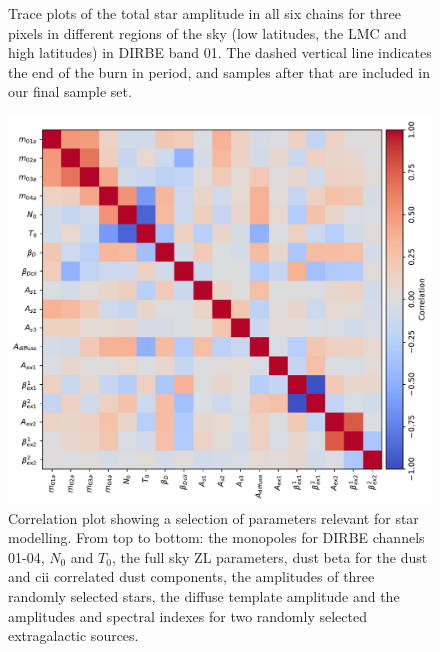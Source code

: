 \documentclass{aa}
\begin{document}
\begin{figure}
  \caption{Trace plots of the total star amplitude in all six chains for three pixels in different regions of the sky (low latitudes, the LMC and high latitudes) in DIRBE band 01. The dashed vertical line indicates the end of the burn in period, and samples after that are included in our final sample set.}
  \label{fig:amptrace}
\end{figure}

\begin{figure}
  \centering
  \includegraphics[width=\textwidth]{figs/correlation/covmatrix.pdf}
  \caption{Correlation plot showing a selection of parameters relevant for star modelling. From top to bottom: the monopoles for DIRBE channels 01-04, $N_{0}$ and $T_0$, the full sky ZL parameters, dust beta for the dust and cii correlated dust components, the amplitudes of three randomly selected stars, the diffuse template amplitude and the amplitudes and spectral indexes for two randomly selected extragalactic sources.}
  \label{fig:corr}
\end{figure}
\end{document}
